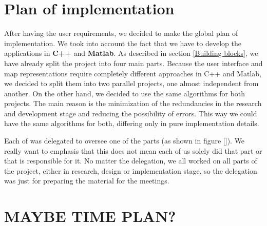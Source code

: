 \section{Plan of implementation}
After having the user requirements, we decided to make the global plan of implementation. We took into account the fact that we have to develop the applications in \textbf{C++} and \textbf{Matlab}. As described in section \ref{Building blocks}, we have already split the project into four main parts. Because the user interface and map representations require completely different approaches in C++ and Matlab, we decided to split them into two parallel projects, one almost independent from another. On the other hand, we decided to use the same algorithms for both projects. The main reason is the minimization of the redundancies in the research and development stage and reducing the possibility of errors. This way we could have the same algorithms for both, differing only in pure implementation details.
\par Each of was delegated to oversee one of the parts (as shown in figure []). We really want to emphasis that this does not mean each of us solely did that part or that is responsible for it. No matter the delegation, we all worked on all parts of the project, either in research, design or implementation stage, so the delegation was just for preparing the material for the meetings.

\section{MAYBE TIME PLAN?}


